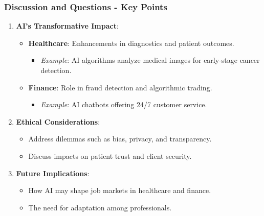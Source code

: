 \documentclass[aspectratio=169]{beamer}
\begin{document}
\begin{frame}[fragile]
    \frametitle{Discussion and Questions - Key Points}
    \begin{enumerate}
        \item \textbf{AI's Transformative Impact}:
        \begin{itemize}
            \item \textbf{Healthcare}: Enhancements in diagnostics and patient outcomes.
            \begin{itemize}
                \item \textit{Example}: AI algorithms analyze medical images for early-stage cancer detection.
            \end{itemize}
            \item \textbf{Finance}: Role in fraud detection and algorithmic trading.
            \begin{itemize}
                \item \textit{Example}: AI chatbots offering 24/7 customer service.
            \end{itemize}
        \end{itemize}

        \item \textbf{Ethical Considerations}:
        \begin{itemize}
            \item Address dilemmas such as bias, privacy, and transparency.
            \item Discuss impacts on patient trust and client security.
        \end{itemize}

        \item \textbf{Future Implications}:
        \begin{itemize}
            \item How AI may shape job markets in healthcare and finance.
            \item The need for adaptation among professionals.
        \end{itemize}
    \end{enumerate}
\end{frame}
\end{document}

